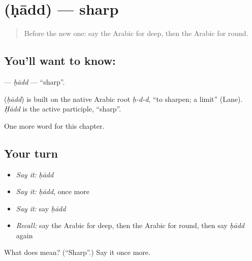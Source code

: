 \section[\texorpdfstring{\ar{حاد} (ḥādd)}{حاد (ḥādd)}]{ (ḥādd) — sharp}

\label{lesson:AR-C148-hadd}



\begin{quote}
Before the new one: say the Arabic for deep, then the Arabic for round.
\end{quote}

\subsection*{You'll want to know: }
\textbf{} — \emph{ḥādd} — \textquotedblleft{}sharp\textquotedblright{}.

\begin{cousinweb}
\textbf{} (\emph{ḥādd}) is built on the native Arabic root \emph{ḥ-d-d}, \textquotedblleft{}to sharpen; a limit\textquotedblright{} (Lane). \emph{Ḥādd} is the active participle, \textquotedblleft{}sharp\textquotedblright{}.
\end{cousinweb}

\begin{grammarlens}[title={What you've built}]
One more word for this chapter.
\end{grammarlens}

\subsection*{Your turn}
\begin{itemize}
\raggedright
  \item \emph{Say it:} \emph{ḥādd}
  \item \emph{Say it:} \emph{ḥādd}, once more
  \item \emph{Say it:} say \emph{ḥādd}
  \item \emph{Recall:} say the Arabic for deep, then the Arabic for round, then say \emph{ḥādd} again
\end{itemize}

\begin{tcolorbox}[breakable,colback=teal!4,colframe=teal!35!black,title={Before you move on}]
What does  mean? (\textquotedblleft{}Sharp\textquotedblright{}.) Say it once more.
\end{tcolorbox}

